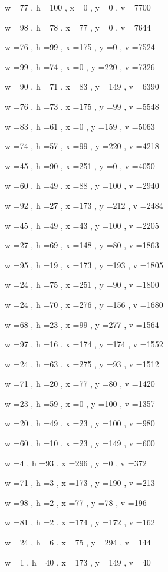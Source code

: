 \documentclass[11pt]{article}
\begin{document}
w =77 , h =100 , x =0 , y =0 , v =7700
\par
w =98 , h =78 , x =77 , y =0 , v =7644
\par
w =76 , h =99 , x =175 , y =0 , v =7524
\par
w =99 , h =74 , x =0 , y =220 , v =7326
\par
w =90 , h =71 , x =83 , y =149 , v =6390
\par
w =76 , h =73 , x =175 , y =99 , v =5548
\par
w =83 , h =61 , x =0 , y =159 , v =5063
\par
w =74 , h =57 , x =99 , y =220 , v =4218
\par
w =45 , h =90 , x =251 , y =0 , v =4050
\par
w =60 , h =49 , x =88 , y =100 , v =2940
\par
w =92 , h =27 , x =173 , y =212 , v =2484
\par
w =45 , h =49 , x =43 , y =100 , v =2205
\par
w =27 , h =69 , x =148 , y =80 , v =1863
\par
w =95 , h =19 , x =173 , y =193 , v =1805
\par
w =24 , h =75 , x =251 , y =90 , v =1800
\par
w =24 , h =70 , x =276 , y =156 , v =1680
\par
w =68 , h =23 , x =99 , y =277 , v =1564
\par
w =97 , h =16 , x =174 , y =174 , v =1552
\par
w =24 , h =63 , x =275 , y =93 , v =1512
\par
w =71 , h =20 , x =77 , y =80 , v =1420
\par
w =23 , h =59 , x =0 , y =100 , v =1357
\par
w =20 , h =49 , x =23 , y =100 , v =980
\par
w =60 , h =10 , x =23 , y =149 , v =600
\par
w =4 , h =93 , x =296 , y =0 , v =372
\par
w =71 , h =3 , x =173 , y =190 , v =213
\par
w =98 , h =2 , x =77 , y =78 , v =196
\par
w =81 , h =2 , x =174 , y =172 , v =162
\par
w =24 , h =6 , x =75 , y =294 , v =144
\par
w =1 , h =40 , x =173 , y =149 , v =40
\par
\newpage
\end{document}
